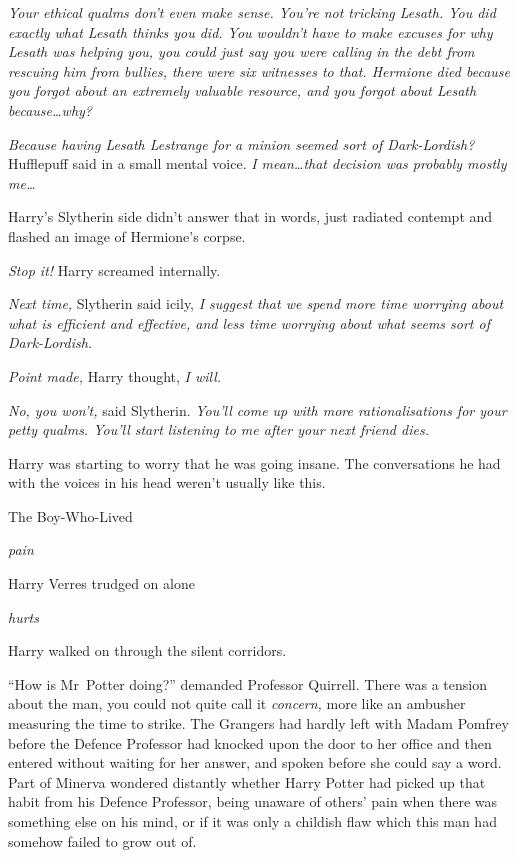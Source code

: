 \emph{Your ethical qualms don’t even make sense. You’re not tricking Lesath. You did exactly what Lesath thinks you did. You wouldn’t have to make excuses for why Lesath was helping you, you could just say you were calling in the debt from rescuing him from bullies, there were six witnesses to that. Hermione died because you forgot about an extremely valuable resource, and you forgot about Lesath because…why?}

\emph{Because having Lesath Lestrange for a minion seemed sort of Dark-Lordish?} Hufflepuff said in a small mental voice. \emph{I mean…that decision was probably mostly me…}

Harry’s Slytherin side didn’t answer that in words, just radiated contempt and flashed an image of Hermione’s corpse.

\emph{Stop it!} Harry screamed internally.

\emph{Next time,} Slytherin said icily, \emph{I suggest that we spend more time worrying about what is efficient and effective, and less time worrying about what seems sort of Dark-Lordish.}

\emph{Point made,} Harry thought, \emph{I will.}

\emph{No, you won’t,} said Slytherin. \emph{You’ll come up with more rationalisations for your petty qualms. You’ll start listening to me after your \emph{next} friend dies.}

Harry was starting to worry that he was going insane. The conversations he had with the voices in his head weren’t usually like this.

The Boy-Who-Lived

\emph{pain}

Harry Verres trudged on alone

\emph{hurts}

Harry walked on through the silent corridors.

\later

“How is Mr~Potter doing?” demanded Professor Quirrell. There was a tension about the man, you could not quite call it \emph{concern,} more like an ambusher measuring the time to strike. The Grangers had hardly left with Madam Pomfrey before the Defence Professor had knocked upon the door to her office and then entered without waiting for her answer, and spoken before she could say a word. Part of Minerva wondered distantly whether Harry Potter had picked up that habit from his Defence Professor, being unaware of others’ pain when there was something else on his mind, or if it was only a childish flaw which this man had somehow failed to grow out of.

